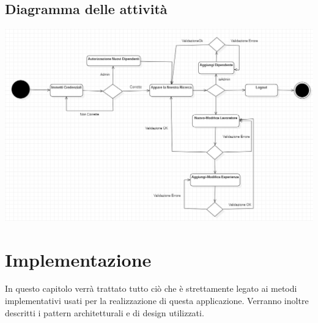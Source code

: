 \documentclass[ 4paper,11pt,openany]{book}
\begin{document}
\section{Diagramma delle attività}
\includegraphics[width=185mm]{attivita.png}

\chapter{Implementazione}
In questo capitolo verrà trattato tutto ciò che è strettamente legato ai metodi implementativi usati per la realizzazione di questa applicazione. Verranno inoltre descritti i pattern architetturali e di design utilizzati.
\end{document}
